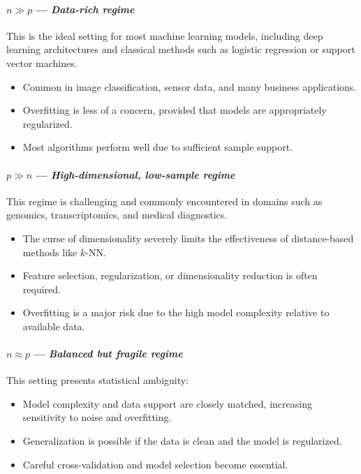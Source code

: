 \documentclass[12pt,openany]{book}
\begin{document}
\paragraph{\(n \gg p\) --- \textit{Data-rich regime}}
This is the ideal setting for most machine learning models, including deep learning architectures and classical methods such as logistic regression or support vector machines.
\begin{itemize}
    \item Common in image classification, sensor data, and many business applications.
    \item Overfitting is less of a concern, provided that models are appropriately regularized.
    \item Most algorithms perform well due to sufficient sample support.
\end{itemize}

\paragraph{\(p \gg n\) --- \textit{High-dimensional, low-sample regime}}
This regime is challenging and commonly encountered in domains such as genomics, transcriptomics, and medical diagnostics.
\begin{itemize}
    \item The curse of dimensionality severely limits the effectiveness of distance-based methods like \(k\)-NN.
    \item Feature selection, regularization, or dimensionality reduction is often required.
    \item Overfitting is a major risk due to the high model complexity relative to available data.
\end{itemize}

\paragraph{\(n \approx p\) --- \textit{Balanced but fragile regime}}
This setting presents statistical ambiguity:
\begin{itemize}
    \item Model complexity and data support are closely matched, increasing sensitivity to noise and overfitting.
    \item Generalization is possible if the data is clean and the model is regularized.
    \item Careful cross-validation and model selection become essential.
\end{itemize}
\end{document}
